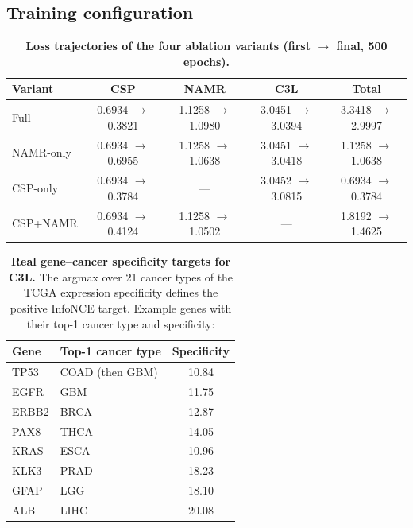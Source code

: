 \documentclass[11pt,a4paper]{article}
\begin{document}
\FloatBarrier


\subsection{Training configuration}

\begin{table}[H]
\centering
\caption{\textbf{Loss trajectories of the four ablation variants (first $\to$ final, 500 epochs).}}
\label{tab:s3}
\footnotesize
\begin{tabular}{@{}lcccc@{}}
\toprule
\textbf{Variant} & \textbf{CSP} & \textbf{NAMR} & \textbf{C3L} & \textbf{Total} \\
\midrule
Full & 0.6934 $\to$ 0.3821 & 1.1258 $\to$ 1.0980 & 3.0451 $\to$ 3.0394 & 3.3418 $\to$ 2.9997 \\
NAMR-only & 0.6934 $\to$ 0.6955 & 1.1258 $\to$ 1.0638 & 3.0451 $\to$ 3.0418 & 1.1258 $\to$ 1.0638 \\
CSP-only & 0.6934 $\to$ 0.3784 & --- & 3.0452 $\to$ 3.0815 & 0.6934 $\to$ 0.3784 \\
CSP+NAMR & 0.6934 $\to$ 0.4124 & 1.1258 $\to$ 1.0502 & --- & 1.8192 $\to$ 1.4625 \\
\bottomrule
\end{tabular}
\end{table}

\begin{table}[H]
\centering
\caption{\textbf{Real gene--cancer specificity targets for C3L.} The argmax over 21 cancer types of the TCGA expression specificity defines the positive InfoNCE target. Example genes with their top-1 cancer type and specificity:}
\label{tab:s4}
\footnotesize
\begin{tabular}{@{}llc@{}}
\toprule
\textbf{Gene} & \textbf{Top-1 cancer type} & \textbf{Specificity} \\
\midrule
TP53 & COAD (then GBM) & 10.84 \\
EGFR & GBM & 11.75 \\
ERBB2 & BRCA & 12.87 \\
PAX8 & THCA & 14.05 \\
KRAS & ESCA & 10.96 \\
KLK3 & PRAD & 18.23 \\
GFAP & LGG & 18.10 \\
ALB & LIHC & 20.08 \\
\bottomrule
\end{tabular}
\end{table}

\FloatBarrier
\end{document}
